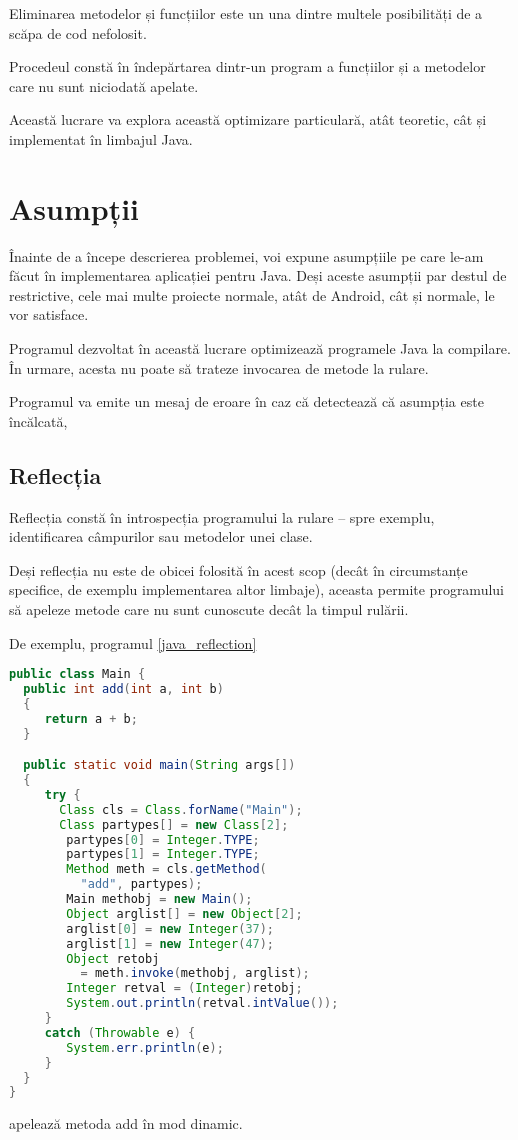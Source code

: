 Eliminarea metodelor și funcțiilor este un una dintre multele
posibilități de a scăpa de cod nefolosit.

Procedeul constă în îndepărtarea dintr-un program a funcțiilor și a
metodelor care nu sunt niciodată apelate.

Această lucrare va explora această optimizare particulară, atât
teoretic, cât și implementat în limbajul Java.



\section{Asumpții}

Înainte de a începe descrierea problemei, voi expune asumpțiile pe care le-am
făcut în implementarea aplicației pentru Java.
Deși aceste asumpții par destul de restrictive, cele mai multe proiecte normale,
atât de Android, cât și normale, le vor satisface.

Programul dezvoltat în această lucrare optimizează programele Java la compilare.
În urmare, acesta nu poate să trateze invocarea de metode la rulare.

Programul va emite un mesaj de eroare în caz că detectează că asumpția este
încălcată,

\subsection{Reflecția}

Reflecția constă în introspecția programului la rulare -- spre exemplu,
identificarea câmpurilor sau metodelor unei clase.

Deși reflecția nu este de obicei folosită în acest scop (decât în circumstanțe
specifice, de exemplu implementarea altor limbaje), aceasta permite programului
să apeleze metode care nu sunt cunoscute decât la timpul rulării.

De exemplu, programul \ref{java_reflection}
\begin{lstlisting}[language=Java]
public class Main {
  public int add(int a, int b)
  {
     return a + b;
  }

  public static void main(String args[])
  {
     try {
       Class cls = Class.forName("Main");
       Class partypes[] = new Class[2];
        partypes[0] = Integer.TYPE;
        partypes[1] = Integer.TYPE;
        Method meth = cls.getMethod(
          "add", partypes);
        Main methobj = new Main();
        Object arglist[] = new Object[2];
        arglist[0] = new Integer(37);
        arglist[1] = new Integer(47);
        Object retobj
          = meth.invoke(methobj, arglist);
        Integer retval = (Integer)retobj;
        System.out.println(retval.intValue());
     }
     catch (Throwable e) {
        System.err.println(e);
     }
  }
}
\end{lstlisting}
apelează metoda add în mod dinamic.

